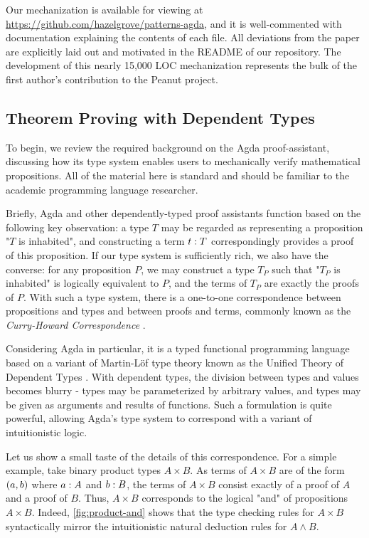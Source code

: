  Our mechanization is available for viewing at \href{https://github.com/hazelgrove/patterns-agda}{https://github.com/hazelgrove/patterns-agda}, and it is well-commented with documentation explaining the contents of each file. All deviations from the paper are explicitly laid out and motivated in the README of our repository. The development of this nearly 15,000 LOC mechanization represents the bulk of the first author's contribution to the Peanut project.
 
\subsection{Theorem Proving with Dependent Types}\label{sec:dependent-types}
To begin, we review the required background on the Agda proof-assistant, discussing how its type system enables users to mechanically verify mathematical propositions. All of the material here is standard and should be familiar to the academic programming language researcher.

Briefly, Agda and other dependently-typed proof assistants function based on the following key observation: a type $T$ may be regarded as representing a proposition "$T$ is inhabited", and constructing a term $t : T$ correspondingly provides a proof of this proposition. If  our type system is sufficiently rich, we also have the converse: for any proposition $P$, we may construct a type $T_P$ such that "$T_P$ is inhabited" is logically equivalent to $P$, and the terms of $T_P$ are exactly the proofs of $P$. With such a type system, there is a one-to-one correspondence between propositions and types and between proofs and terms, commonly known as the \emph{Curry-Howard Correspondence} \cite{howard1980formulae}. 

Considering Agda in particular, it is a typed functional programming language based on a variant of Martin-L\"of type theory \cite{DBLP:books/daglib/0000395} known as the Unified Theory of Dependent Types \cite{DBLP:books/daglib/0078470, norell:thesis}. With dependent types, the division between types and values becomes blurry - types may be parameterized by arbitrary values, and types may be given as arguments and results of functions. Such a formulation is quite powerful, allowing Agda's type system to correspond with a variant of intuitionistic logic. 

Let us show a small taste of the details of this correspondence. For a simple example, take binary product types $A \times B$. As terms of $A \times B$ are of the form $(a , b)$ where $a : A$ and $b : B$, the terms of $A \times B$ consist exactly of a proof of $A$ and a proof of $B$. Thus, $A \times B$ corresponds to the logical "and" of propositions $A \times B$. Indeed, \autoref{fig:product-and} shows that the type checking rules for $A \times B$ syntactically mirror the intuitionistic natural deduction rules for $A \land B$.

